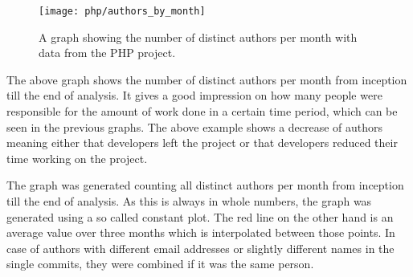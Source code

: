 \begin{figure}[h!t]
  \centering
  \texttt{[image: php/authors\_by\_month]}
  \caption[The authors by month graph]
  {A graph showing the number of distinct authors per month with data from the
    PHP project.}
\end{figure}

The above graph shows the number of distinct authors per month from inception
till the end of analysis. It gives a good impression on how many people were
responsible for the amount of work done in a certain time period, which can be
seen in the previous graphs. The above example shows a decrease of authors
meaning either that developers left the project or that developers reduced
their time working on the project.

The graph was generated counting all distinct authors per month from inception
till the end of analysis. As this is always in whole numbers, the graph was
generated using a so called constant plot. The red line on the other hand is an
average value over three months which is interpolated between those points. In
case of authors with different email addresses or slightly different names in
the single commits, they were combined if it was the same person.



